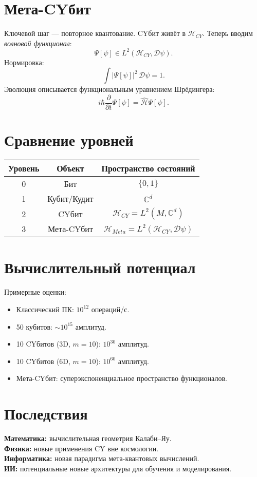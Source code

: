 \documentclass[12pt,a4paper]{article}
\begin{document}
\section{Мета-CYбит}
Ключевой шаг --- повторное квантование.
CYбит живёт в $\mathcal{H}_{CY}$.
Теперь вводим \emph{волновой функционал}:
\[
\Psi[\psi] \in L^2(\mathcal{H}_{CY},\mathcal{D}\psi).
\]
Нормировка:
\[
\int |\Psi[\psi]|^2 \,\mathcal{D}\psi = 1.
\]
Эволюция описывается функциональным уравнением Шрёдингера:
\[
i\hbar \frac{\partial}{\partial t} \Psi[\psi] 
= \hat{\mathcal{H}} \Psi[\psi].
\]

\section{Сравнение уровней}
\begin{tabular}{|c|c|c|}
\hline
Уровень & Объект & Пространство состояний \\
\hline
0 & Бит & $\{0,1\}$ \\
1 & Кубит/Кудит & $\mathbb{C}^d$ \\
2 & CYбит & $\mathcal{H}_{CY} = L^2(M,\mathbb{C}^d)$ \\
3 & Мета-CYбит & $\mathcal{H}_{Meta} = L^2(\mathcal{H}_{CY},\mathcal{D}\psi)$ \\
\hline
\end{tabular}

\section{Вычислительный потенциал}
Примерные оценки:
\begin{itemize}
\item Классический ПК: $10^{12}$ операций/с.
\item 50 кубитов: $\sim 10^{15}$ амплитуд.
\item 10 CYбитов (3D, $m=10$): $10^{30}$ амплитуд.
\item 10 CYбитов (6D, $m=10$): $10^{60}$ амплитуд.
\item Мета-CYбит: суперэкспоненциальное пространство функционалов.
\end{itemize}

\section{Последствия}
\textbf{Математика:} вычислительная геометрия Калаби--Яу. \\
\textbf{Физика:} новые применения CY вне космологии. \\
\textbf{Информатика:} новая парадигма мета-квантовых вычислений. \\
\textbf{ИИ:} потенциальные новые архитектуры для обучения и моделирования.
\end{document}
